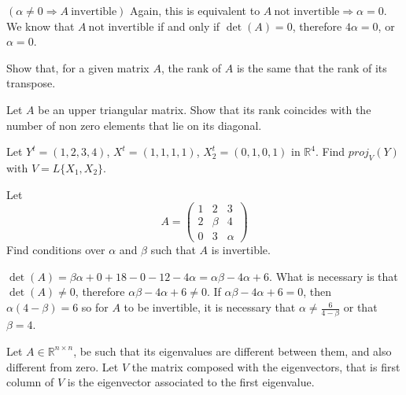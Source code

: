 \documentclass[answers]{exam}
\begin{document}
\begin{questions}
\begin{solution}
    $(\alpha \neq 0 \Rightarrow A\ \text{invertible})$ Again, this is equivalent to $A\ \text{not invertible}\Rightarrow \alpha = 0$. We know that $A\ \text{not invertible}$ if and only if $\det(A)=0$, therefore $4\alpha=0$, or $\alpha=0$.
\end{solution}

\question Show that, for a given matrix $A$, the rank of $A$ is the same that the rank of its transpose.

\question Let $A$ be an upper triangular matrix. Show that its rank coincides with the number of non zero elements that lie on its diagonal.

\question Let $Y^t=(1,2,3,4)$, $X^t=(1,1,1,1)$, $X_2^t=(0,1,0,1)$ in $\mathbb{R}^4$. Find $proj_V(Y)$ with $V=L\{X_1,X_2\}$.

\question Let $$A=\left(\begin{array}{ccc}1&2&3\\2&\beta&4\\0&3&\alpha\end{array}\right)$$
Find conditions over $\alpha$ and $\beta$ such that $A$ is invertible.

\begin{solution}
    $\det(A)=\beta\alpha+0+18-0-12-4\alpha=\alpha\beta-4\alpha+6$. What is necessary is that $\det(A)\neq0$, therefore $\alpha\beta-4\alpha+6\neq0$. If $\alpha\beta-4\alpha+6=0$, then $\alpha(4-\beta)=6$ so for $A$ to be invertible, it is necessary that $\alpha\neq\frac{6}{4-\beta}$ or that $\beta=4$.
\end{solution}

\question Let $A\in\mathbb{R}^{n\times n}$, be such that its eigenvalues are different between them, and also different from zero. Let $V$ the matrix composed with the eigenvectors, that is first column of $V$ is the eigenvector associated to the first eigenvalue.



\end{questions}
\end{document}
